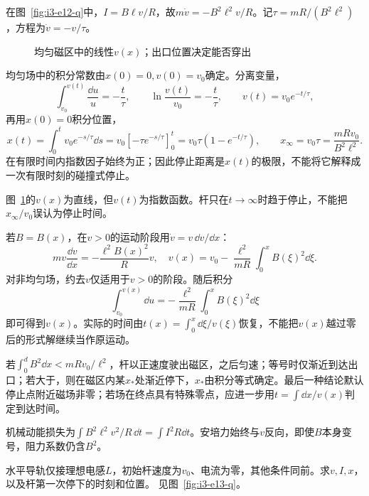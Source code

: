\begin{solution}
在图~\ref{fig:i3-e12-q}中，$I=B\ell v/R$，故$m\dot v=-B^2\ell^2v/R$。记$\tau=mR/(B^2\ell^2)$，方程为$\dot v=-v/\tau$。

\begin{figure}[H]\centering
{}
\caption{均匀磁区中的线性$v(x)$；出口位置决定能否穿出}\label{fig:i3-e12-s}
\end{figure}

均匀场中的积分常数由$x(0)=0,v(0)=v_0$确定。分离变量，
\[
\int_{v_0}^{v(t)}\frac{\dd u}{u}=-\frac t\tau,\qquad
\ln\frac{v(t)}{v_0}=-\frac t\tau,\qquad v(t)=v_0e^{-t/\tau},
\]
再用$x(0)=0$积分位置，
\[x(t)=\int_0^t v_0e^{-s/\tau}\dd s
=v_0[-\tau e^{-s/\tau}]_0^t=v_0\tau(1-e^{-t/\tau}),\qquad
x_\infty=v_0\tau=\frac{mRv_0}{B^2\ell^2}.\]
在有限时间内指数因子始终为正；因此停止距离是$x(t)$的极限，不能将它解释成一次有限时刻的碰撞式停止。

图~\ref{fig:i3-e12-s}的$v(x)$为直线，但$v(t)$为指数函数。杆只在$t\to\infty$时趋于停止，不能把$x_\infty/v_0$误认为停止时间。

若$B=B(x)$，在$v>0$的运动阶段用$\dot v=v\,\dd v/\dd x$：
\[
mv\frac{\dd v}{\dd x}=-\frac{\ell^2B(x)^2}{R}v,
\quad
\boxed{v(x)=v_0-\frac{\ell^2}{mR}\int_0^xB(\xi)^2\dd\xi}.
\]
对非均匀场，约去$v$仅适用于$v>0$的阶段。随后积分
\[
\int_{v_0}^{v(x)}\dd u
=-\frac{\ell^2}{mR}\int_0^xB(\xi)^2\dd\xi
\]
即可得到$v(x)$。实际的时间由$t(x)=\int_0^x\dd\xi/v(\xi)$恢复，不能把$v(x)$越过零后的形式解继续当作原运动。

若$\int_0^dB^2\dd x<mRv_0/\ell^2$，杆以正速度驶出磁区，之后匀速；等号时仅渐近到达出口；若大于，则在磁区内某$x_*$处渐近停下，$x_*$由积分等式确定。最后一种结论默认停止点附近磁场非零；若场在终点具有特殊零点，应进一步用$t=\int\dd x/v(x)$判定到达时间。

机械动能损失为$\int B^2\ell^2v^2/R\,\dd t=\int I^2R\dd t$。安培力始终与$v$反向，即使$B$本身变号，阻力系数仍含$B^2$。
\end{solution}

\begin{example}[无阻电感导轨的往复运动]\label{ex:i3-e13}

水平导轨仅接理想电感$L$，初始杆速度为$v_0$、电流为零，其他条件同前。求$v,I,x$，以及杆第一次停下的时刻和位置。
 见图~\ref{fig:i3-e13-q}。
\end{example}

